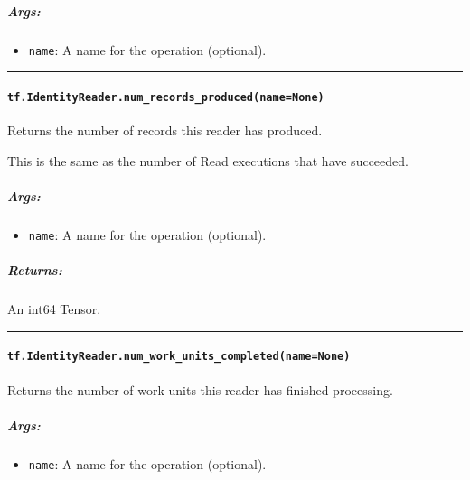 \subparagraph{Args: }\label{args-22}

\begin{itemize}
\tightlist
\item
  \texttt{name}: A name for the operation (optional).
\end{itemize}

\begin{center}\rule{0.5\linewidth}{\linethickness}\end{center}

\paragraph{\texorpdfstring{\texttt{tf.IdentityReader.num\_records\_produced(name=None)}
}{tf.IdentityReader.num\_records\_produced(name=None) }}\label{tf.identityreader.numux5frecordsux5fproducednamenone}

Returns the number of records this reader has produced.

This is the same as the number of Read executions that have succeeded.

\subparagraph{Args: }\label{args-23}

\begin{itemize}
\tightlist
\item
  \texttt{name}: A name for the operation (optional).
\end{itemize}

\subparagraph{Returns: }\label{returns-19}

An int64 Tensor.

\begin{center}\rule{0.5\linewidth}{\linethickness}\end{center}

\paragraph{\texorpdfstring{\texttt{tf.IdentityReader.num\_work\_units\_completed(name=None)}
}{tf.IdentityReader.num\_work\_units\_completed(name=None) }}\label{tf.identityreader.numux5fworkux5funitsux5fcompletednamenone}

Returns the number of work units this reader has finished processing.

\subparagraph{Args: }\label{args-24}

\begin{itemize}
\tightlist
\item
  \texttt{name}: A name for the operation (optional).
\end{itemize}

